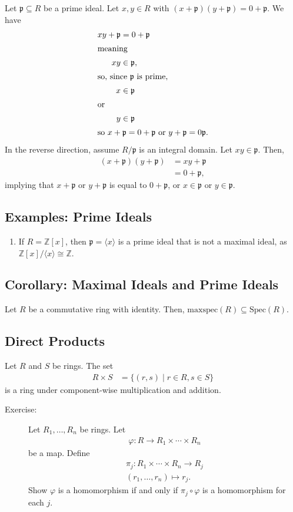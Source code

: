 \documentclass[8pt]{extarticle}
\newcommand{\Z}{\mathbb{Z}}
\begin{document}
  Let $\mathfrak{p}\subseteq R$ be a prime ideal. Let $x,y\in R$ with $(x+\mathfrak{p})(y + \mathfrak{p}) = 0 + \mathfrak{p}$. We have
  \begin{align*}
    xy + \mathfrak{p} &= 0 + \mathfrak{p}\\
    \intertext{meaning}
    xy &\in \mathfrak{p},\\
    \intertext{so, since $\mathfrak{p}$ is prime,}
    x&\in \mathfrak{p}\\
    \intertext{or}
    y&\in \mathfrak{p}\\
    \intertext{so $x + \mathfrak{p} = 0 + \mathfrak{p}$ or $y + \mathfrak{p} = 0\mathfrak{p}$.}
  \end{align*}
  In the reverse direction, assume $R/\mathfrak{p}$ is an integral domain. Let $xy\in \mathfrak{p}$. Then,
  \begin{align*}
    (x+\mathfrak{p})  (y + \mathfrak{p}) &= xy + \mathfrak{p}\\
                                         &= 0 + \mathfrak{p},
  \end{align*}
  implying that $x + \mathfrak{p}$ or $y + \mathfrak{p}$ is equal to $0 + \mathfrak{p}$, or $x \in \mathfrak{p}$ or $y\in \mathfrak{p}$.
  \subsection{Examples: Prime Ideals}%
  \begin{enumerate}[(1)]
    \item If $R = \Z[x]$, then $\mathfrak{p} = \langle x \rangle$ is a prime ideal that is not a maximal ideal, as $\Z[x]/\langle x \rangle\cong \Z$.
  \end{enumerate}
  \subsection{Corollary: Maximal Ideals and Prime Ideals}%
  Let $R$ be a commutative ring with identity. Then, $\text{maxspec}(R)\subseteq \text{Spec}(R)$.
  \subsection{Direct Products}%
  Let $R$ and $S$ be rings. The set
  \begin{align*}
    R\times S &= \{(r,s)\mid r\in R, s\in S\}
  \end{align*}
   is a ring under component-wise multiplication and addition.
   \begin{description}
     \item[Exercise:] Let $R_1,\dots,R_n$ be rings. Let 
       \begin{align*}
         \varphi: R\rightarrow R_1\times \cdots \times R_n
       \end{align*}
      be a map. Define
      \begin{align*}
        \pi_j: R_1\times\cdots\times R_n \rightarrow R_j\\
        (r_1,\dots,r_n)\mapsto r_j.
      \end{align*}
      Show $\varphi$ is a homomorphism if and only if $\pi_j\circ \varphi$ is a homomorphism for each $j$.
   \end{description}
\end{document}
